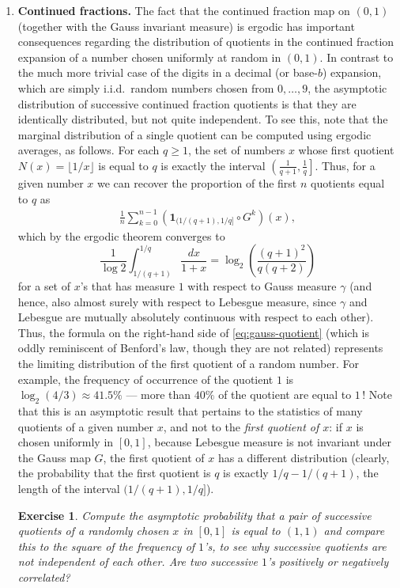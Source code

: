 \documentclass[12pt]{article}
\newtheorem{exercise}[thm]{Exercise}
\newcommand{\ind}{\textbf{1}}
\theoremstyle{example}
\begin{document}
\begin{enumerate}
\item \textbf{Continued fractions.} The fact that the continued fraction map on $(0,1)$ (together with the Gauss invariant measure) is ergodic has important consequences regarding the distribution of quotients in the continued fraction expansion of a number chosen uniformly at random in $(0,1)$. In contrast to the much more trivial case of the digits in a decimal (or base-$b$) expansion, which are simply i.i.d.\ random numbers chosen from $0,\ldots,9$, the asymptotic distribution of successive continued fraction quotients is that they are identically distributed, but not quite independent. To see this, note that the marginal distribution of a single quotient can be computed using ergodic averages, as follows. For each $q\ge 1$, the set of numbers $x$ whose first quotient $N(x)=\lfloor 1/x \rfloor$ is equal to $q$ is exactly the interval $\left(\frac{1}{q+1},\frac{1}{q}\right]$. Thus, for a given number $x$ we can recover the proportion of the first $n$ quotients equal to $q$ as
\begin{align*}
\frac{1}{n} \sum_{k=0}^{n-1} \left(\ind_{(1/(q+1),1/q]}\circ G^k\right)(x),
\end{align*}
which by the ergodic theorem converges to 
\begin{equation} \label{eq:gauss-quotient}
\frac{1}{\log 2}\int_{1/(q+1)}^{1/q} \frac{dx}{1+x} = \log_2 \left( \frac{(q+1)^2}{q(q+2)}\right)
\end{equation}
for a set of $x$'s that has measure $1$ with respect to Gauss measure $\gamma$ (and hence, also almost surely with respect to Lebesgue measure, since $\gamma$ and Lebesgue are mutually absolutely continuous with respect to each other). Thus, the formula on the right-hand side of \eqref{eq:gauss-quotient} (which is oddly reminiscent of Benford's law, though they are not related) represents the limiting distribution of the first quotient of a random number. For example, the frequency of occurrence of the quotient $1$ is $\log_2(4/3) \approx 41.5\%$ --- more than $40\%$ of the quotient are equal to $1$\,! Note that this is an asymptotic result that pertains to the statistics of many quotients of a given number $x$, and not to the \emph{first quotient of $x$}: if $x$ is chosen uniformly in $[0,1]$, because Lebesgue measure is not invariant under the Gauss map $G$, the first quotient of $x$ has a different distribution (clearly, the probability that the first quotient is $q$ is exactly $1/q-1/(q+1)$, the length of the interval $(1/(q+1),1/q]$).

\begin{exercise} Compute the asymptotic probability that a pair of successive quotients of a randomly chosen $x$ in $[0,1]$ is equal to $(1,1)$ and compare this to the square of the frequency of $1$'s, to see why successive quotients are not independent of each other. Are two successive $1$'s positively or negatively correlated?
\end{exercise}


\end{enumerate}
\end{document}
